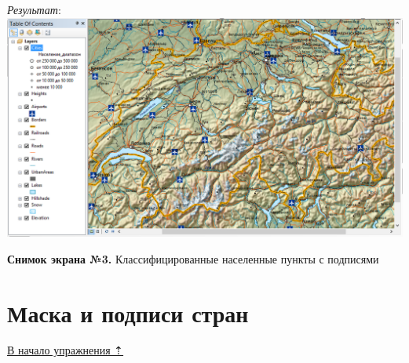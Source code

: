 \documentclass[12pt,]{book}
\begin{document}
\begin{enumerate}
  \emph{Результат}:
  \includegraphics{images/Ex02/image22.png}
\end{enumerate}

\textbf{Снимок экрана №3.} Классифицированные населенные пункты с подписями

\hypertarget{map-design-general-mask}{%
\section{Маска и подписи стран}\label{map-design-general-mask}}

\protect\hyperlink{map-design-general}{В начало упражнения ⇡}
\end{document}

